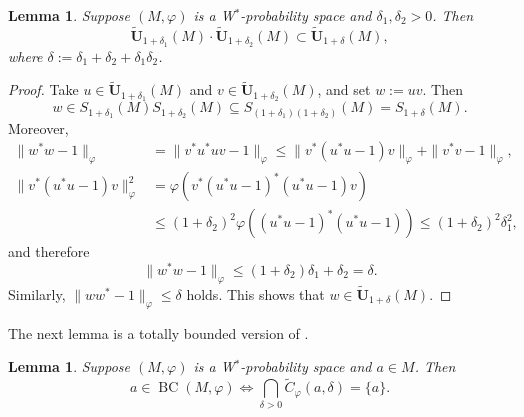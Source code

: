 \documentclass[12pt]{amsart}
\newtheorem{lem}[thm]{Lemma}
\theoremstyle{definition}
\def\BC{\operatorname{BC}}
\begin{document}
\begin{lem}\label{lem tildeU is multiplicative}
Suppose $(M,\varphi)$ is a W$^*$-probability space and $\delta_1,\delta_2>0$. Then $$\tilde{\mathbf{U}}_{1+\delta_1}(M)\cdot\tilde{\mathbf{U}}_{1+\delta_2}(M)\subset \tilde{\mathbf{U}}_{1+\delta}(M),$$ where $\delta:=\delta_1+\delta_2+\delta_1\delta_2$. 
\end{lem}
\begin{proof}
    Take $u\in \tilde{\mathbf{U}}_{1+\delta_1}(M)$ and $v\in \tilde{\mathbf{U}}_{1+\delta_2}(M)$, and set $w:=uv$. Then $$w\in S_{1+\delta_1}(M)S_{1+\delta_2}(M)\subseteq S_{(1+\delta_1)(1+\delta_2)}(M)=S_{1+\delta}(M).$$ Moreover, 
    \begin{align*}
        \|w^*w-1\|_{\varphi}&=\|v^*u^*uv-1\|_{\varphi}\leq\|v^*(u^*u-1)v\|_{\varphi}+\|v^*v-1\|_{\varphi},\\
        \|v^*(u^*u-1)v\|_{\varphi}^2&=\varphi(v^*(u^*u-1)^*(u^*u-1)v)\\
        &\le (1+\delta_2)^2\varphi((u^*u-1)^*(u^*u-1))\le (1+\delta_2)^2\delta_1^2,
    \end{align*}
    and therefore 
    $$\|w^*w-1\|_{\varphi}\le (1+\delta_2)\delta_1+\delta_2=\delta.$$
    Similarly, $\|ww^*-1\|_{\varphi}\le \delta$ holds. This shows that $w\in \tilde{\mathbf{U}}_{1+\delta}(M)$. 
\end{proof}
The next lemma is a totally bounded version of \cite[Lemma 1.2]{haagerup87}. 
\begin{lem}\label{lem Haageruptb1.2}
Suppose $(M,\varphi)$ is a W$^*$-probability space and $a\in M$. Then 
$$a\in \BC(M,\varphi)\iff \bigcap_{\delta>0}\widetilde{C}_{\varphi}(a,\delta)=\{a\}.$$
\end{lem}
\end{document}
